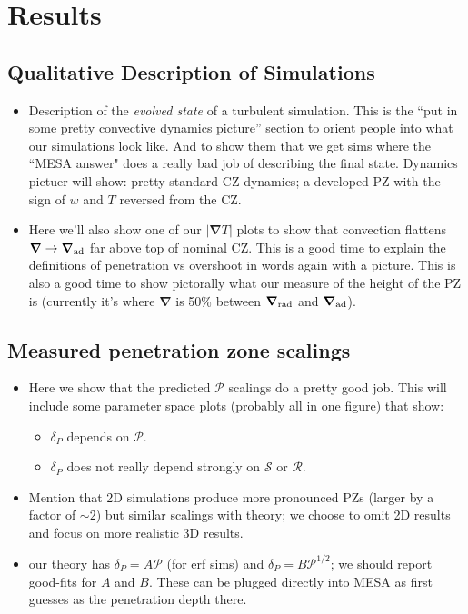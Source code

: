 \documentclass[12pt]{article}
\renewcommand{\vec}[1]{\boldsymbol{#1}}
\newcommand{\grad}{\vec{\nabla}}
\begin{document}
\section{Results}

\subsection{Qualitative Description of Simulations}
\begin{itemize}
\item Description of the \emph{evolved state} of a turbulent simulation.
This is the ``put in some pretty convective dynamics picture'' section to orient people into what our simulations look like.
And to show them that we get sims where the ``MESA answer" does a really bad job of describing the final state.
Dynamics pictuer will show: pretty standard CZ dynamics; a developed PZ with the sign of $w$ and $T$ reversed from the CZ.
\item Here we'll also show one of our $|\grad T|$ plots to show that convection flattens $\grad \rightarrow \grad_{\rm{ad}}$ far above top of nominal CZ.
This is a good time to explain the definitions of penetration vs overshoot in words again with a picture.
This is also a good time to show pictorally what our measure of the height of the PZ is (currently it's where $\grad$ is 50\% between $\grad_{\rm{rad}}$ and $\grad_{\rm{ad}}$).
\end{itemize}

\subsection{Measured penetration zone scalings}
\begin{itemize}
\item Here we show that the predicted $\mathcal{P}$ scalings do a pretty good job.
This will include some parameter space plots (probably all in one figure) that show:
\begin{itemize}
\item $\delta_P$ depends on $\mathcal{P}$.
\item $\delta_P$ does not really depend strongly on $\mathcal{S}$ or $\mathcal{R}$.
\end{itemize}
\item Mention that 2D simulations produce more pronounced PZs (larger by a factor of $\sim 2$) but similar scalings with theory; we choose to omit 2D results and focus on more realistic 3D results.
\item our theory has $\delta_P = A \mathcal{P}$ (for erf sims) and $\delta_P = B \mathcal{P}^{1/2}$; we should report good-fits for $A$ and $B$.
These can be plugged directly into MESA as first guesses as the penetration depth there.
\end{itemize}
\end{document}
